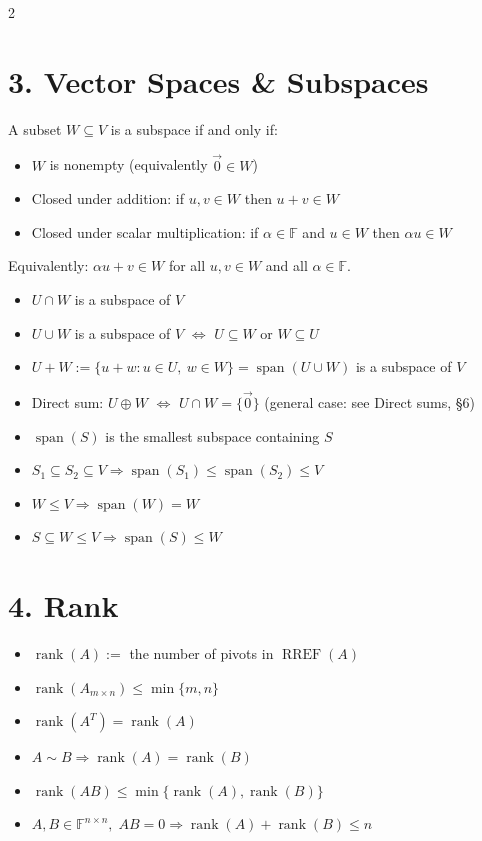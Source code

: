 \documentclass[fleqn]{article}
\begin{document}
\begin{multicols}{2}
\section*{3. Vector Spaces \& Subspaces}
A subset $W \subseteq V$ is a subspace if and only if:
\begin{itemize}
\item $W$ is nonempty (equivalently $\vec{0} \in W$)
\item Closed under addition: if $u,v \in W$ then $u+v \in W$
\item Closed under scalar multiplication: if $\alpha \in \mathbb{F}$ and $u \in W$ then $\alpha u \in W$
\end{itemize}
Equivalently: $\alpha u + v \in W$ for all $u,v \in W$ and all $\alpha \in \mathbb{F}$.

\begin{itemize}
\item $U \cap W$ is a subspace of $V$
\item $U \cup W$ is a subspace of $V$ $\iff$ $U \subseteq W$ or $W \subseteq U$
\item $U+W := \{u+w : u \in U,\ w \in W\} = \operatorname{span}(U \cup W)$ is a subspace of $V$
\item Direct sum: $U \oplus W$ $\iff$ $U \cap W = \{\vec{0}\}$ (general case: see Direct sums, \S6)
\item $\operatorname{span}(S)$ is the smallest subspace containing $S$
\item $S_1 \subseteq S_2 \subseteq V \Rightarrow \operatorname{span}(S_1) \le \operatorname{span}(S_2) \le V$
\item $W \le V \Rightarrow \operatorname{span}(W)=W$
\item $S \subseteq W \le V \Rightarrow \operatorname{span}(S) \le W$
\end{itemize}

\vspace{-3ex}
\section*{4. Rank}
\begin{itemize}
\item $\operatorname{rank}(A) :=$ the number of pivots in $\operatorname{RREF}(A)$
\item $\operatorname{rank}(A_{m\times n}) \le \min\{m,n\}$
\item $\operatorname{rank}(A^T)=\operatorname{rank}(A)$
\item $A \sim B \Rightarrow \operatorname{rank}(A)=\operatorname{rank}(B)$
\item $\operatorname{rank}(AB) \le \min\{\operatorname{rank}(A),\operatorname{rank}(B)\}$
\item $A,B \in \mathbb{F}^{n\times n},\; AB=0 \Rightarrow \operatorname{rank}(A)+\operatorname{rank}(B) \le n$
\end{itemize}


\end{multicols}
\end{document}
